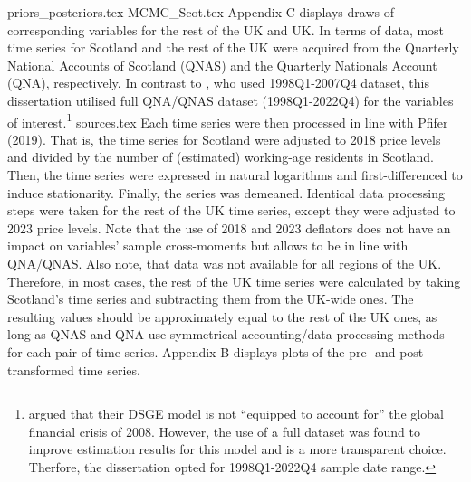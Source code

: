 {priors_posteriors.tex}
{MCMC_Scot.tex}
Appendix C displays draws of corresponding variables for the rest of the UK and UK. In terms of data, most time series for Scotland and the rest of the UK were acquired from the Quarterly National Accounts of Scotland (QNAS) and the Quarterly Nationals Account (QNA), respectively. In contrast to \textcite{ricci_2019_essays}, who used 1998Q1-2007Q4 dataset, this dissertation utilised full QNA/QNAS dataset (1998Q1-2022Q4) for the variables of interest.\enlargethispage{\baselineskip}\footnote{\textcite{ricci_2019_essays} argued that their DSGE model is not ``equipped to account for''\parencite[123]{ricci_2019_essays} the global financial crisis of 2008. However, the use of a full dataset was found to improve estimation results for this model and is a more transparent choice. Therfore, the dissertation opted for 1998Q1-2022Q4 sample date range.\nopagebreak}
{sources.tex}
Each time series were then processed in line with Pfifer (2019). That is, the time series for Scotland were adjusted to 2018 price levels and divided by the number of (estimated) working-age residents in Scotland. Then, the time series were expressed in natural logarithms and first-differenced to induce stationarity. Finally, the series was demeaned. Identical data processing steps were taken for the rest of the UK time series, except they were adjusted to 2023 price levels. Note that the use of 2018 and 2023 deflators does not have an impact on variables' sample cross-moments but allows to be in line with QNA/QNAS. Also note, that data was not available for all regions of the UK. Therefore, in most cases, the rest of the UK time series were calculated by taking Scotland's time series and subtracting them from the UK-wide ones. The resulting values should be approximately equal to the rest of the UK ones, as long as QNAS and QNA use symmetrical accounting/data processing methods for each pair of time series. Appendix B displays plots of the pre- and post-transformed time series.